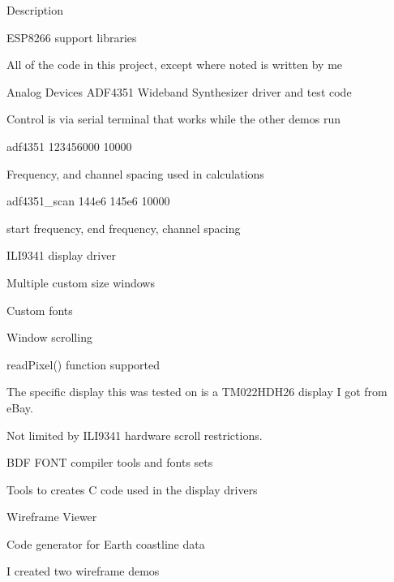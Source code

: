 \begin{DoxyParagraph}{Description}

\begin{DoxyItemize}
\item E\+S\+P8266 support libraries
\begin{DoxyItemize}
\item All of the code in this project, except where noted is written by me
\item Analog Devices A\+D\+F4351 Wideband Synthesizer driver and test code
\begin{DoxyItemize}
\item Control is via serial terminal that works while the other demos run
\item adf4351 123456000 10000
\begin{DoxyItemize}
\item Frequency, and channel spacing used in calculations
\end{DoxyItemize}
\item adf4351\+\_\+scan 144e6 145e6 10000
\begin{DoxyItemize}
\item start frequency, end frequency, channel spacing
\end{DoxyItemize}
\end{DoxyItemize}
\item I\+L\+I9341 display driver
\begin{DoxyItemize}
\item Multiple custom size windows
\item Custom fonts
\item Window scrolling
\item read\+Pixel() function supported
\item The specific display this was tested on is a T\+M022\+H\+D\+H26 display I got from e\+Bay.
\item Not limited by I\+L\+I9341 hardware scroll restrictions.
\end{DoxyItemize}
\item B\+DF F\+O\+NT compiler tools and fonts sets
\begin{DoxyItemize}
\item Tools to creates C code used in the display drivers
\end{DoxyItemize}
\item Wireframe Viewer
\begin{DoxyItemize}
\item Code generator for Earth coastline data
\item I created two wireframe demos

\end{DoxyItemize}
\end{DoxyItemize}
\end{DoxyItemize}
\end{DoxyParagraph}
